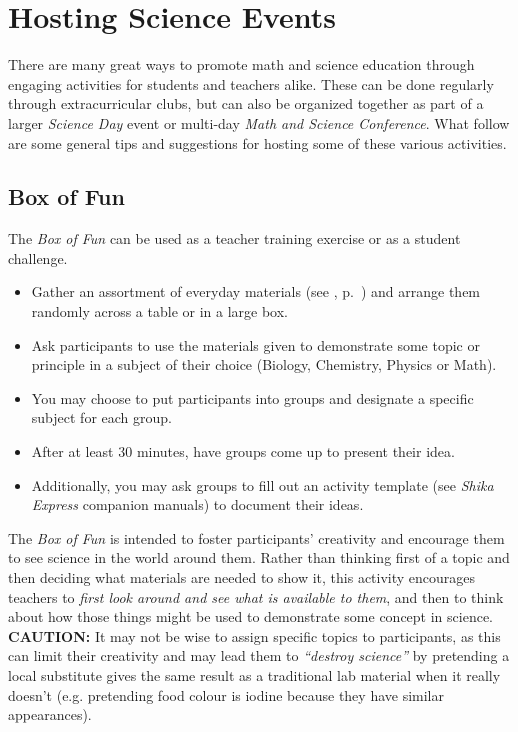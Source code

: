 \chapter{Hosting Science Events} 

There are many great ways to promote math and science education through engaging activities for students and teachers alike. These can be done regularly through extracurricular clubs, but can also be organized together as part of a larger \emph{Science Day} event or multi-day \emph{Math and Science Conference}. What follow are some general tips and suggestions for hosting some of these various activities.

\section{Box of Fun} 
The \emph{Box of Fun} can be used as a teacher training exercise or as a student challenge. 
\begin{itemize}
\item Gather an assortment of everyday materials (see , p.~\pageref{cha:labequip}) and arrange them randomly across a table or in a large box. 
\item Ask participants to use the materials given to demonstrate some topic or principle in a subject of their choice (Biology, Chemistry, Physics or Math).
\item You may choose to put participants into groups and designate a specific subject for each group.
\item After at least 30 minutes, have groups come up to present their idea.
\item Additionally, you may ask groups to fill out an activity template (see \emph{Shika Express} companion manuals) to document their ideas.
\end{itemize}

The \emph{Box of Fun} is intended to foster participants' creativity and encourage them to see science in the world around them. Rather than thinking first of a topic and then deciding what materials are needed to show it, this activity encourages teachers to \emph{first look around and see what is available to them}, and then to think about how those things might be used to demonstrate some concept in science. \\

\noindent \textbf{CAUTION:} It may not be wise to assign specific topics to participants, as this can limit their creativity and may lead them to \emph{``destroy science''} by pretending a local substitute gives the same result as a traditional lab material when it really doesn't (e.g. pretending food colour is iodine because they have similar appearances). 


